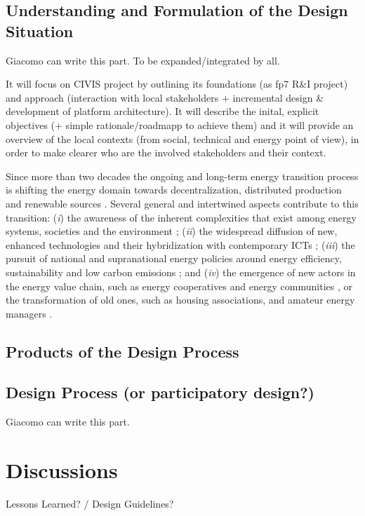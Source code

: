 \subsection{Understanding and Formulation of the Design Situation}
\begin{svgraybox}
[note by GP] Giacomo can write this part. To be expanded/integrated by all.

It will focus on CIVIS project by outlining its foundations (as fp7 R\&I project) and approach (interaction with local stakeholders + incremental design \& development of platform architecture). It will describe the inital, explicit objectives (+ simple rationale/roadmapp to achieve them) and it will provide an overview of the local contexts (from social, technical and energy point of view), in order to make clearer who are the involved stakeholders and their context.
\end{svgraybox}

Since more than two decades the ongoing and long-term energy transition process is shifting the energy domain
towards decentralization, distributed production and renewable sources \cite{rifkin_third_2011; sovacool_how_2016}.
Several general and intertwined aspects contribute to this transition: (\textit{i}) the awareness of the inherent complexities
that exist among energy systems, societies and the environment \cite{bulkeley_bringing_2012; umbach_global_2010}; (\textit{ii}) the
widespread diffusion of new, enhanced technologies and their hybridization with contemporary ICTs \cite{putrus_smart_2013; schick_innovating_2013};
(\textit{iii}) the pursuit of national and supranational energy policies around energy efficiency, sustainability and low carbon emissions \cite{da_graca_carvalho_eu_2012};
and (\textit{iv}) the emergence of new actors in the energy value chain, such as energy cooperatives and
energy communities \cite{viardot_role_2013}, or the transformation of old ones, such as housing associations,
and amateur energy managers \cite{hasselqvist_linking_2016}.



\subsection{Products of the Design Process}

\subsection{Design Process (or participatory design?)}

\begin{svgraybox}
[note by GP] Giacomo can write this part. 

\end{svgraybox}


\section{Discussions}

\begin{svgraybox}
Lessons Learned?  / Design Guidelines? 
\end{svgraybox}